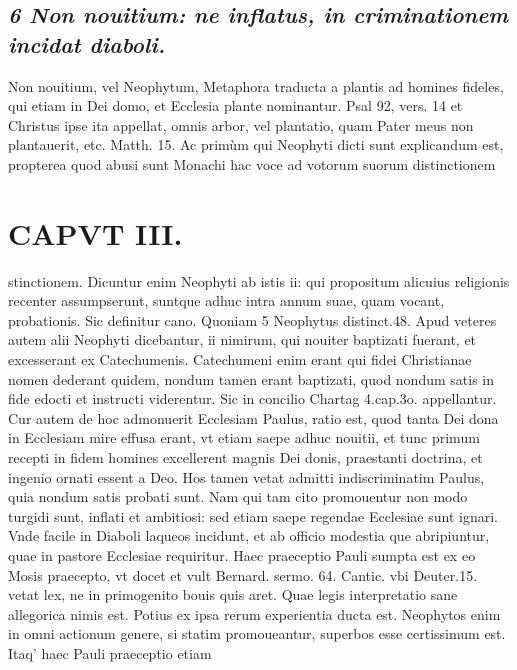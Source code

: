 \documentclass{article}
\begin{document}
\begin{pages}
\subsection*{\textit{6 Non nouitium: ne inflatus, in criminationem incidat diaboli. }}\pstart Non nouitium, vel Neophytum, Metaphora traducta a plantis ad homines fideles, qui etiam in Dei domo, et Ecclesia plante nominantur. Psal 92, vers. 14 et Christus ipse ita appellat, omnis arbor, vel plantatio, quam Pater meus non plantauerit, etc. Matth. 15. Ac primùm qui Neophyti dicti sunt explicandum est, propterea quod abusi sunt Monachi hac voce ad votorum suorum distinctionem  \pend
\section*{CAPVT  III. }
\marginpar{[ p.145 ]}\pstart stinctionem. Dicuntur enim Neophyti ab istis ii: qui propositum alicuius religionis recenter assumpserunt, suntque adhuc intra annum suae, quam vocant, probationis. Sic definitur cano. Quoniam 5 Neophytus distinct.48. Apud veteres autem alii Neophyti dicebantur, ii nimirum, qui nouiter baptizati fuerant, et excesserant ex Catechumenis. Catechumeni enim erant qui fidei Christianae nomen dederant quidem, nondum tamen erant baptizati, quod nondum satis in fide edocti et instructi viderentur. Sic in concilio Chartag 4.cap.3o. appellantur.  \pend\pstart Cur autem de hoc admonuerit Ecclesiam Paulus, ratio est, quod tanta Dei dona in Ecclesiam mire effusa erant, vt etiam saepe adhuc nouitii, et tunc primum recepti in fidem homines excellerent magnis Dei donis, praestanti doctrina, et ingenio ornati essent a Deo. Hos tamen vetat admitti indiscriminatim Paulus, quia nondum satis probati sunt. Nam qui tam cito promouentur non modo turgidi sunt, inflati et ambitiosi: sed etiam saepe regendae Ecclesiae sunt ignari. Vnde facile in Diaboli laqueos incidunt, et ab officio modestia que abripiuntur, quae in pastore Ecclesiae requiritur.  \pend\pstart Haec praeceptio Pauli sumpta est ex eo Mosis praecepto, vt docet et vult Bernard. sermo. 64. Cantic. vbi Deuter.15. vetat lex, ne in primogenito bouis quis aret. Quae legis interpretatio sane allegorica nimis est. Potius ex ipsa rerum experientia ducta est. Neophytos enim in omni actionum genere, si statim promoueantur, superbos esse certissimum est. Itaq' haec Pauli praeceptio etiam  \pend

\end{pages}
\end{document}
